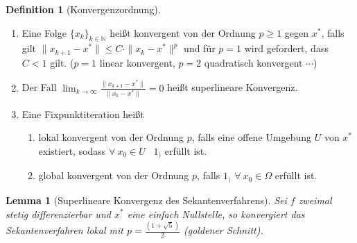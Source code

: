 \documentclass[10pt,a4paper]{article}
\newtheorem{lemma}{Lemma}[section]
\theoremstyle{definition} \newtheorem{definition}{Definition}[section]
\theoremstyle{bemerkung}    \newtheorem{bemerkung}{Bemerkung}[]
\begin{document}
\begin{definition}[Konvergenzordnung]
~
\begin{enumerate}
\item Eine Folge $\{x_k \}_{k\in\mathbb{N}}$ heißt konvergent von der Ordnung $p\geq 1$ gegen $x^*$,
falls gilt $\| x_{k+1}-x^*\|\leq C\cdot \|x_k-x^*\|^p$ und für $p=1$ wird gefordert, dass $C<1$ gilt.
($p=1$ linear konvergent, $p=2$ quadratisch konvergent $\cdots$)
\item Der Fall $\lim_{k \to \infty}\frac{\|x_{k+1}-x^*\|}{\|x_k -x^*\|}=0$ heißt superlineare Konvergenz.
\item Eine Fixpunktiteration heißt
  \begin{enumerate}
  \item lokal konvergent von der Ordnung $p$, falls eine offene Umgebung $U$ von $x^*$ existiert,
        sodass $\forall \ x_0\in U$ \ $1_)$ erfüllt ist.
  \item global konvergent von der Ordnung $p$, falls $1_)$ $\forall \ x_0\in \Omega$ erfüllt ist.
  \end{enumerate}
\end{enumerate}
\end{definition}

\begin{lemma}[Superlineare Konvergenz des Sekantenverfahrens]
Sei $f$ zweimal stetig differenzierbar und $x^*$ eine einfach Nullstelle, so konvergiert das Sekantenverfahren lokal mit $p=\frac{(1+\sqrt{5})}{2}$ (goldener Schnitt).
\end{lemma}
\end{document}
